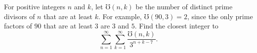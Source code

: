 For positive integers $n$ and $k$, let $\mho(n,k)$ be the number of distinct prime divisors of $n$ that are at least $k$. For example, $\mho(90, 3)=2$, since the only prime factors of $90$ that are at least $3$ are $3$ and $5$. Find the closest integer to
\[\sum_{n=1}^\infty \sum_{k=1}^\infty \frac{\mho(n,k)}{3^{n+k-7}}.\]

